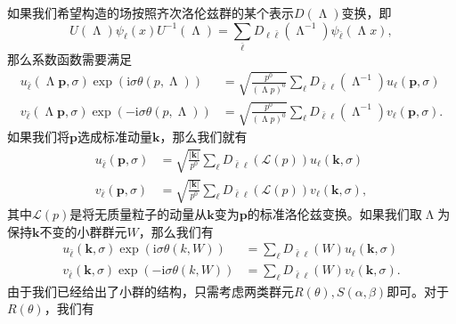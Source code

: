 如果我们希望构造的场按照齐次洛伦兹群的某个表示$D( \upLambda )$变换，即
\begin{equation*}
	U( \upLambda ) \psi _{\ell }( x) U^{-1}( \upLambda ) =\sum _{\bar{\ell }} D_{\ell \bar{\ell }} (\upLambda ^{-1} )\psi _{\bar{\ell }}( \upLambda x) ,
\end{equation*}
那么系数函数需要满足
\begin{equation*}
	\begin{aligned}
		u_{\bar{\ell }}( \upLambda \boldsymbol{p} ,\sigma )\exp(\mathrm{i} \sigma \theta ( p,\upLambda )) & =\sqrt{\frac{p^{0}}{( \upLambda p)^{0}}}\sum _{\ell } D_{\bar{\ell } \ell } (\upLambda ^{-1} )u_{\ell }(\boldsymbol{p} ,\sigma )\\
		v_{\bar{\ell }}( \upLambda \boldsymbol{p} ,\sigma )\exp( -\mathrm{i} \sigma \theta ( p,\upLambda )) & =\sqrt{\frac{p^{0}}{( \upLambda p)^{0}}}\sum _{\ell } D_{\bar{\ell } \ell } (\upLambda ^{-1} )v_{\ell }(\boldsymbol{p} ,\sigma ) .
	\end{aligned}
\end{equation*}
如果我们将$\boldsymbol{p}$选成标准动量$\boldsymbol{k}$，那么我们就有
\begin{equation*}
	\begin{aligned}
		u_{\bar{\ell }}(\boldsymbol{p} ,\sigma ) & =\sqrt{\frac{| \boldsymbol{k}| }{p^{0}}}\sum _{\ell } D_{\bar{\ell } \ell }(\mathcal{L}( p)) u_{\ell }(\boldsymbol{k} ,\sigma )\\
		v_{\bar{\ell }}(\boldsymbol{p} ,\sigma ) & =\sqrt{\frac{| \boldsymbol{k}| }{p^{0}}}\sum _{\ell } D_{\bar{\ell } \ell }(\mathcal{L}( p)) v_{\ell }(\boldsymbol{k} ,\sigma ) ,
	\end{aligned}
\end{equation*}
其中$\mathcal{L}( p)$是将无质量粒子的动量从$\boldsymbol{k}$变为$\boldsymbol{p}$的标准洛伦兹变换。如果我们取$\upLambda $为保持$\boldsymbol{k}$不变的小群群元$W$，那么我们有
\begin{equation*}
	\begin{aligned}
		u_{\bar{\ell }}(\boldsymbol{k} ,\sigma )\exp(\mathrm{i} \sigma \theta ( k,W)) & =\sum _{\ell } D_{\bar{\ell } \ell }( W) u_{\ell }(\boldsymbol{k} ,\sigma )\\
		v_{\bar{\ell }}(\boldsymbol{k} ,\sigma )\exp( -\mathrm{i} \sigma \theta ( k,W)) & =\sum _{\ell } D_{\bar{\ell } \ell }( W) v_{\ell }(\boldsymbol{k} ,\sigma ) .
	\end{aligned}
\end{equation*}
由于我们已经给出了小群的结构，只需考虑两类群元$R( \theta ) ,S( \alpha ,\beta )$即可。对于$R( \theta )$，我们有
